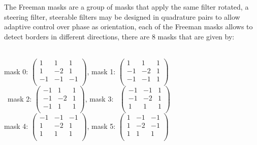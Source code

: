 \documentclass[a4paper]{article}
\begin{document}
The Freeman masks are a group of masks that apply the same filter rotated, a steering filter, steerable filters may be designed in quadrature pairs to allow adaptive control over phase as orientation, each of the Freeman masks allows to detect borders in different directions, there are 8 masks that are given by:\\
\\
\begin{centering}
mask 0: \begin{math}
   \begin{pmatrix} 
   1 & 1 & 1 \\ 
   1 & -2 & 1 \\
   -1 & -1 & -1 \\ 
   \end{pmatrix}
\end{math}, mask 1: \begin{math}
   \begin{pmatrix} 
   1 & 1 & 1 \\ 
   -1 & -2 & 1 \\
   -1 & -1 & 1 \\ 
   \end{pmatrix}
\end{math}\\

\ mask 2: \begin{math}
   \begin{pmatrix} 
   -1 & 1 & 1 \\ 
   -1 & -2 & 1 \\
   -1 & 1 & 1 \\ 
   \end{pmatrix}
\end{math}, mask 3: \ \begin{math}
   \begin{pmatrix} 
   -1 & -1 & 1 \\ 
   -1 & -2 & 1 \\
   1 & 1 & 1 \\ 
   \end{pmatrix}
\end{math}\\

mask 4: \begin{math}
   \begin{pmatrix} 
   -1 & -1 & -1 \\ 
   1 & -2 & 1 \\
   1 & 1 & 1 \\ 
   \end{pmatrix}
\end{math}, mask 5: \begin{math}
   \begin{pmatrix} 
   1 & -1 & -1 \\ 
   1 & -2 & -1 \\
   1 & 1 & 1 \\ 
   \end{pmatrix}
\end{math}\\


\end{centering}
\end{document}

